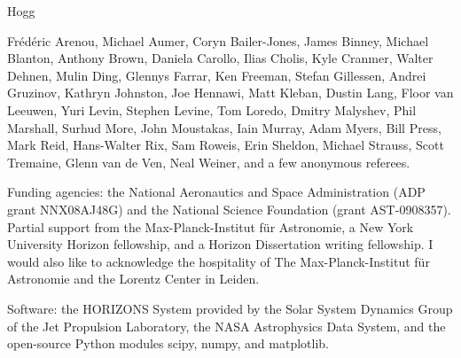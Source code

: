 

Hogg

Fr{\'e}d{\'e}ric Arenou, Michael Aumer, Coryn Bailer-Jones, James
Binney, Michael Blanton, Anthony Brown, Daniela Carollo, Ilias Cholis,
Kyle Cranmer, Walter Dehnen, Mulin Ding, Glennys Farrar, Ken Freeman,
Stefan Gillessen, Andrei Gruzinov, Kathryn Johnston, Joe Hennawi, Matt
Kleban, Dustin Lang, Floor van Leeuwen, Yuri Levin, Stephen Levine,
Tom Loredo, Dmitry Malyshev, Phil Marshall, Surhud More, John
Moustakas, Iain Murray, Adam Myers, Bill Press, Mark Reid, Hans-Walter
Rix, Sam Roweis, Erin Sheldon, Michael Strauss, Scott Tremaine, Glenn
van de Ven, Neal Weiner, and a few anonymous referees.

Funding agencies: the National Aeronautics and Space Administration
(ADP grant NNX08AJ48G) and the National Science Foundation (grant
AST-0908357). Partial support from the Max-Planck-Institut f\"ur
Astronomie, a New York University Horizon fellowship, and a Horizon
Dissertation writing fellowship. I would also like to acknowledge the
hospitality of The Max-Planck-Institut f\"ur Astronomie and the
Lorentz Center in Leiden.

Software: the HORIZONS System provided by the Solar System Dynamics
Group of the Jet Propulsion Laboratory, the NASA Astrophysics Data
System, and the open-source Python modules scipy, numpy, and
matplotlib.



